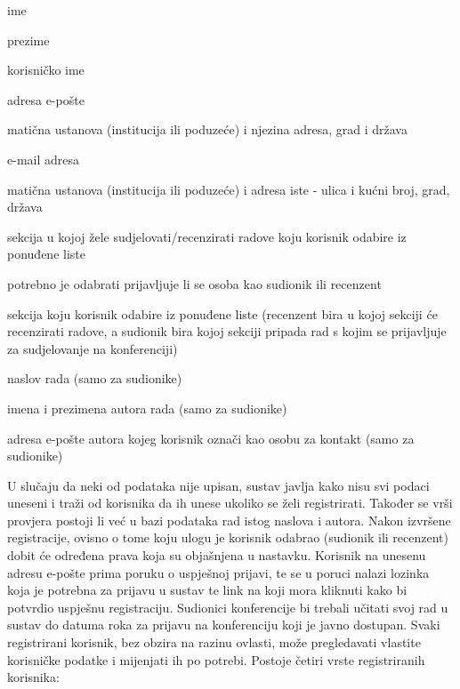		\begin{packed_item}

			\item ime
			\item prezime
			\item korisničko ime
			\item adresa e-pošte
			\item matična ustanova (institucija ili poduzeće) i njezina adresa, grad i država

			\item e-mail adresa
			\item matična ustanova (institucija ili poduzeće) i adresa iste - ulica i kućni broj, grad, država
			\item sekcija u kojoj žele sudjelovati/recenzirati radove koju korisnik odabire iz ponuđene liste

			\item potrebno je odabrati prijavljuje li se osoba kao sudionik ili recenzent
			\item sekcija koju korisnik odabire iz ponuđene liste (recenzent bira u kojoj sekciji će recenzirati radove, a sudionik bira kojoj sekciji pripada rad s kojim se prijavljuje za sudjelovanje na konferenciji)
			\item naslov rada (samo za sudionike)

			\item imena i prezimena autora rada (samo za sudionike)
			\item adresa e-pošte autora kojeg korisnik označi kao osobu za kontakt (samo za sudionike)

		
		\end{packed_item}
	
		U slučaju da neki od podataka nije upisan, sustav javlja kako nisu svi podaci uneseni i traži od korisnika da ih unese ukoliko se želi registrirati. Također se vrši provjera postoji li već u bazi podataka rad istog naslova i autora. Nakon izvršene registracije, ovisno o tome koju ulogu je korisnik odabrao (sudionik ili recenzent) dobit će određena prava koja su objašnjena u nastavku. Korisnik na unesenu adresu e-pošte prima poruku o uspješnoj prijavi, te se u poruci nalazi lozinka koja je potrebna za prijavu u sustav te link na koji mora kliknuti kako bi potvrdio uspješnu registraciju. Sudionici konferencije bi trebali učitati svoj rad u sustav do datuma roka za prijavu na konferenciju koji je javno dostupan.
		\newline
		\newline
		\indent Svaki registrirani korisnik, bez obzira na razinu ovlasti, može pregledavati vlastite korisničke podatke i mijenjati ih po potrebi.
		\newline
		\newline
		\indent Postoje četiri vrste registriranih korisnika:

